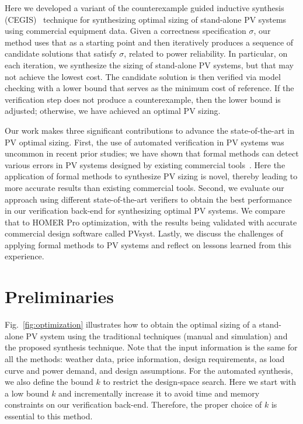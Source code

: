 \documentclass[runningheads]{llncs}
\begin{document}
Here we developed a variant of the counterexample guided inductive synthesis (CEGIS)~\cite{DBLP:conf/asplos/Solar-LezamaTBSS06} technique for synthesizing optimal sizing of stand-alone PV systems using commercial equipment data. Given a correctness specification $\sigma$, our method uses that as a starting point and then iteratively produces a sequence of candidate solutions that satisfy $\sigma$, related to power reliability. In particular, on each iteration, we synthesize the sizing of stand-alone PV systems, but that may not achieve the lowest cost. The candidate solution is then verified via model checking with a lower bound that serves as the minimum cost of reference. If the verification step does not produce a counterexample, then the lower bound is adjusted; otherwise, we have achieved an optimal PV sizing.

Our work makes three significant contributions to advance the state-of-the-art in PV optimal sizing. First, the use of automated verification in PV systems was uncommon in recent prior studies; we have shown that formal methods can detect various errors in PV systems designed by existing commercial tools~\cite{TrindadeCordeiro19}. Here the application of formal methods to synthesize PV sizing is novel, thereby leading to more accurate results than existing commercial tools. Second, we evaluate our approach using different state-of-the-art verifiers to obtain the best performance in our verification back-end for synthesizing optimal PV systems. We compare that to HOMER Pro optimization, with the results being validated with accurate commercial design software called PVsyst. Lastly, we discuss the challenges of applying formal methods to PV systems and reflect on lessons learned from this experience.

\vspace{-2ex}

\section{Preliminaries}
\label{sec:AutomatedVerification}
\vspace{-1ex}

Fig.~\ref{fig:optimization} illustrates how to obtain the optimal sizing of a stand-alone PV system using the traditional techniques (manual and simulation) and the proposed synthesis technique. Note that the input information is the same for all the methods: weather data, price information, design requirements, as load curve and power demand, and design assumptions. For the automated synthesis, we also define the bound $k$ to restrict the design-space search. Here we start with a low bound $k$ and incrementally increase it to avoid time and memory constraints on our verification back-end. Therefore, the proper choice of $k$ is essential to this method.
\end{document}
